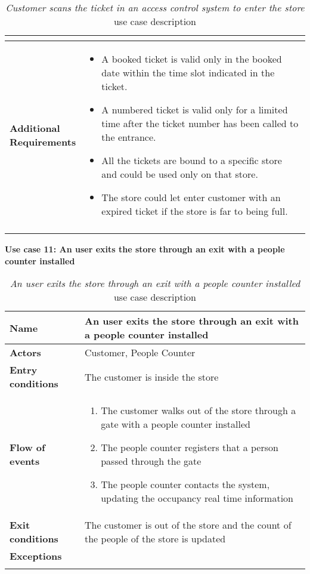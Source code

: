 \begin{longtable}{p{0.25\linewidth}p{0.75\linewidth}}
\begin{itemize}
    \end{itemize}  \\
    \bottomrule
    \textbf{Additional \linebreak Requirements} &
    \begin{itemize}
        \item A booked ticket is valid only in the booked date within the time slot indicated in the ticket.
        \item A numbered ticket is valid only for a limited time after the ticket number has been called to the entrance. 
        \item All the tickets are bound to a specific store and could be used only on that store.
        \item The store could let enter customer with an expired ticket if the store is far to being full. 
    \end{itemize} \\
    \bottomrule
    \caption{\emph{Customer scans the ticket in an access control system to enter the store} use case description}
    \end{longtable}

    \clearpage
    \textbf{Use case 11: An user exits the store through an exit with a people counter installed}
    \smallskip
    \begin{longtable}{p{0.25\linewidth}p{0.75\linewidth}}
    \toprule
    \textbf{Name} & \textbf{An user exits the store through an exit with a people counter installed} \\
    \midrule
    \textbf{Actors} & Customer, People Counter\\
    \midrule
    \textbf{Entry conditions} & The customer is inside the store\\
    \midrule
    \textbf{Flow of events} & 
    \begin{enumerate}
        \item The customer walks out of the store through a gate with a people counter installed
        \item The people counter registers that a person passed through the gate
        \item The people counter contacts the system, updating the occupancy real time information
    \end{enumerate} \\
    \midrule
    \textbf{Exit conditions} & The customer is out of the store and the count of the people of the store is updated\\
    \midrule
    \textbf{Exceptions} & \\
    \bottomrule
    \caption{\emph{An user exits the store through an exit with a people counter installed} use case description}
    \end{longtable}

